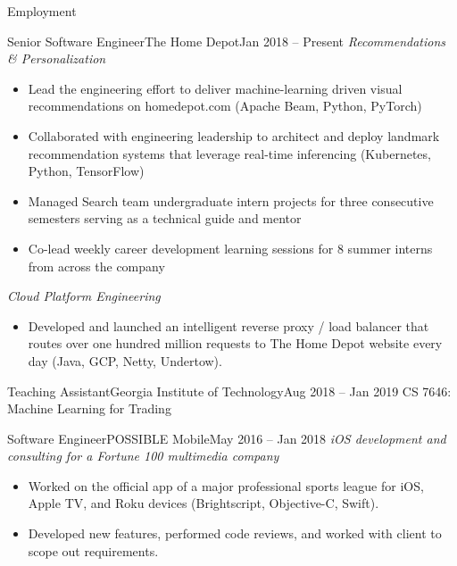 \documentclass[]{mcdowellcv}
\begin{document}
	\begin{cvsection}{Employment}
		\begin{cvsubsection}{Senior Software Engineer}{The Home Depot}{Jan 2018 -- Present}
			\textit{Recommendations \& Personalization}
			\begin{itemize}
				\item Lead the engineering effort to deliver machine-learning driven visual recommendations on homedepot.com (Apache Beam, Python, PyTorch)
				\item Collaborated with engineering leadership to architect and deploy landmark recommendation systems that leverage real-time inferencing (Kubernetes, Python, TensorFlow) 
				\item Managed Search team undergraduate intern projects for three consecutive semesters serving as a technical guide and mentor
				\item Co-lead weekly career development learning sessions for 8 summer interns from across the company
			\end{itemize}
			\textit{Cloud Platform Engineering}
			\begin{itemize}
				\item Developed and launched an intelligent reverse proxy / load balancer that routes over one hundred million requests to The Home Depot website every day (Java, GCP, Netty, Undertow).
			\end{itemize}
		\end{cvsubsection}

		\begin{cvsubsection}{Teaching Assistant}{Georgia Institute of Technology}{Aug 2018 -- Jan 2019}
			CS 7646: Machine Learning for Trading
		\end{cvsubsection}
		
		\begin{cvsubsection}{Software Engineer}{POSSIBLE Mobile}{May 2016 -- Jan 2018}	
			\textit{iOS development and consulting for a Fortune 100 multimedia company}
			\begin{itemize}
				\item Worked on the official app of a major professional sports league for iOS, Apple TV, and Roku devices (Brightscript, Objective-C, Swift).
				\item Developed new features, performed code reviews, and worked with client to scope out requirements.
			\end{itemize}
		\end{cvsubsection}
		

\end{cvsection}
\end{document}
